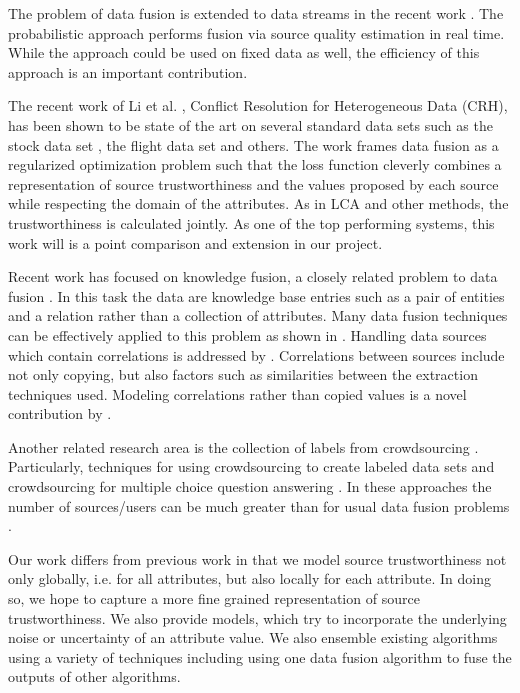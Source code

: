 \documentclass{acm_proc_article-sp}
\begin{document}
The problem of data fusion is extended to data streams in the recent work \cite{zhao:truth}. The probabilistic approach performs fusion via source quality estimation in real time. While the approach could be used on fixed data as well, the efficiency of this approach is an important contribution. 

The recent work of Li et al. \cite{li:resolving}, Conflict Resolution for Heterogeneous Data (CRH), has been shown to be state of the art on several standard data sets such as the stock data set \cite{li:truth}, the flight data set \cite{li:truth} and others. The work frames data fusion as a regularized optimization problem such that the loss function cleverly combines a representation of source trustworthiness and the values proposed by each source while respecting the domain of the attributes. As in LCA and other methods, the trustworthiness is calculated jointly. As one of the top performing systems, this work will is a point comparison and extension in our project. 

Recent work has focused on knowledge fusion, a closely related problem to data fusion \cite{dong:data} \cite{pochampally:fusing} \cite{yu:wisdom}.  In this task the data are knowledge base entries such as a pair of entities and a relation rather than a collection of attributes. Many data fusion techniques can be effectively applied to this problem as shown in \cite{dong:data}. Handling data sources which contain correlations is addressed by \cite{pochampally:fusing}. Correlations between sources include not only copying, but also factors such as similarities between the extraction techniques used. Modeling correlations rather than copied values is a novel contribution by  \cite{pochampally:fusing}.


Another related research area is the collection of labels from crowdsourcing \cite{nguyen:minimizing}. Particularly, techniques for using crowdsourcing to create labeled data sets \cite{sheng:get} \cite{nguyen:minimizing} and crowdsourcing for multiple choice question answering \cite{bachrach:grade}. In these approaches the number of sources/users can be much greater than for usual data fusion problems \cite{li:truth} \cite{nguyen:minimizing}.

Our work differs from previous work in that we model source trustworthiness not only globally, i.e. for all attributes, but also locally for each attribute. In doing so, we hope to capture a more fine grained representation of source trustworthiness. We also provide models, which try to incorporate the underlying noise or uncertainty of an attribute value. We also ensemble existing algorithms using a variety of techniques including using one data fusion algorithm to fuse the outputs of other algorithms. 
\end{document}
